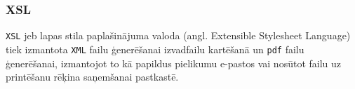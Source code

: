 \subsubsection{XSL}
\par \texttt{XSL} jeb lapas stila paplašinājuma valoda (angl. Extensible Stylesheet Language) tiek izmantota \texttt{XML} failu ģenerēšanai izvadfailu kartēšanā un  \texttt{pdf} failu ģenerēšanai, izmantojot to kā papildus pielikumu e-pastos vai nosūtot failu uz printēšanu rēķina saņemšanai pastkastē. 
